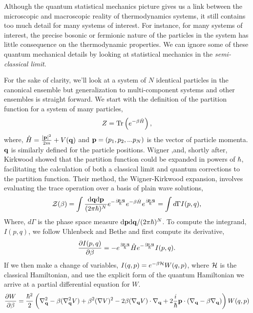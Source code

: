 Although the quantum statistical mechanics picture gives us a link between the microscopic and macroscopic reality of thermodynamics systems, it still contains too much detail for many systems of interest.
For instance, for many systems of interest, the precise bosonic or fermionic nature of the particles in the system has little consequence on the thermodynamic properties.
We can ignore some of these quantum mechanical details by looking at statistical mechanics in the \textit{semi-classical limit}.

For the sake of clarity, we'll look at a system of $N$ identical particles in the canonical ensemble but generalization to multi-component systems and other ensembles is straight forward. 
We start with the definition of the partition function for a system of many particles,  
%
\begin{equation}
    Z = \mathrm{Tr}\left( e^{-\beta\hat{H}} \right),
\end{equation} 
%
where, $\hat{H} = \frac{\vert\mathbf{p}\vert^2}{2m} + V(\mathbf{q})$ and $\mathbf{p} = (p_1, p_2, ...p_N)$ is the vector of particle momenta. 
$\mathbf{q}$ is similarly defined for the particle positions.
Wigner \cite{PhysRev.40.749},and, shortly after, Kirkwood \cite{PhysRev.44.31} showed that the partition function could be expanded in powers of $\hbar$, facilitating the calculation of both a classical limit and quantum corrections to the partition function.
Their method, the Wigner-Kirkwood expansion, involves evaluating the trace operation over a basis of plain wave solutions,
%
\begin{equation}
	\mathcal{Z}(\beta) = \int 
		\frac{\mathrm{d}\mathbf{q} \mathrm{d}\mathbf{p}}{(2\pi \hbar)^N}
		e^{-\frac{i\mathbf{p}\cdot\mathbf{q}}{\hbar}}
		e^{-\beta \hat{H}}
		e^{\frac{i\mathbf{p}\cdot\mathbf{q}}{\hbar}} = \int d\Gamma I(p, q),
\end{equation}
%
Where, $d\Gamma$ is the phase space measure $\mathrm{d}\mathbf{p}\mathrm{d}\mathbf{q}/(2\pi\hbar)^N$.
To compute the integrand, $I(p, q)$, we follow Uhlenbeck and Bethe \cite{Uhlenbeck1936729} and first compute its derivative,
%
\begin{equation}
	\frac{\partial I(p, q)}{\partial \beta} = -e^{\frac{i\mathbf{p}\cdot\mathbf{q}}{\hbar}}\hat{H}e^{-\frac{i\mathbf{p}\cdot\mathbf{q}}{\hbar}} I(p, q).
\end{equation}
%
If we then make a change of variables, $I(q, p) = e^{-\beta\mathcal{H}}W(q, p)$, where $\mathcal{H}$ is the classical Hamiltonian, and use the explicit form of the quantum Hamiltonian we arrive at a partial differential equation for $W$.
%
\begin{equation}
	\frac{\partial W}{\partial \beta} = \frac{\hbar^2}{2} \left(
		\nabla_{\mathbf{q}}^2 - 
		\beta(\nabla_{\mathbf{q}}^2V) + 
		\beta^2(\nabla V)^2 -
		2\beta(\nabla_{\mathbf{q}} V)\cdot\nabla_{\mathbf{q}} + 
		2 \frac{i}{\hbar}\mathbf{p}\cdot(\nabla_{\mathbf{q}} - \beta\nabla_{\mathbf{q}})
	\right)W(q, p)
\end{equation}
